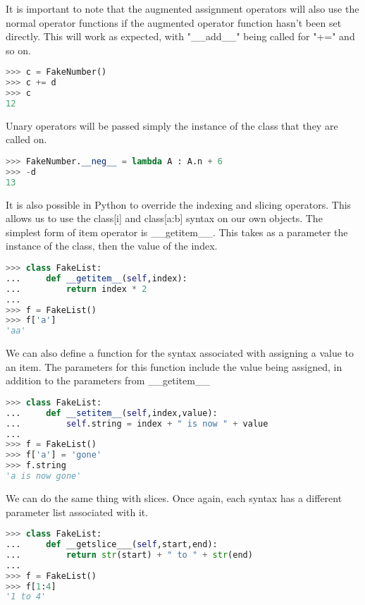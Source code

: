 It is important to note that the augmented assignment operators will also use
the normal operator functions if the augmented operator function hasn't been set
directly. This will work as expected, with "\_\_add\_\_" being called for "+=" and
so on.
\lstset{basicstyle=\scriptsize, numbers=left, captionpos=b, tabsize=4}
\begin{lstlisting}[caption=Add Assign Operator,language={Python},
xleftmargin=15pt, label=lst:addassignoperator]
>>> c = FakeNumber()
>>> c += d
>>> c
12
\end{lstlisting}

Unary operators will be passed simply the instance of the class that they are
called on.
\lstset{basicstyle=\scriptsize, numbers=left, captionpos=b, tabsize=4}
\begin{lstlisting}[caption=Unary Example,language={Python},
xleftmargin=15pt, label=lst:unaryexample]
>>> FakeNumber.__neg__ = lambda A : A.n + 6
>>> -d
13
\end{lstlisting}

It is also possible in Python to override the indexing and slicing operators.
This allows us to use the class[i] and class[a:b] syntax on our own objects.
The simplest form of item operator is \_\_getitem\_\_. This takes as a parameter the
instance of the class, then the value of the index.
\lstset{basicstyle=\scriptsize, numbers=left, captionpos=b, tabsize=4}
\begin{lstlisting}[caption=Index Operator,language={Python},
xleftmargin=15pt, label=lst:indexoperator]
>>> class FakeList:
...     def __getitem__(self,index):
...         return index * 2
...
>>> f = FakeList()
>>> f['a']
'aa'
\end{lstlisting}

We can also define a function for the syntax associated with assigning a value
to an item. The parameters for this function include the value being assigned,
in addition to the parameters from \_\_getitem\_\_
\lstset{basicstyle=\scriptsize, numbers=left, captionpos=b, tabsize=4}
\begin{lstlisting}[caption=Index Assign,language={Python},
xleftmargin=15pt, label=lst:indexassign]
>>> class FakeList:
...     def __setitem__(self,index,value):
...         self.string = index + " is now " + value
...
>>> f = FakeList()
>>> f['a'] = 'gone'
>>> f.string
'a is now gone'
\end{lstlisting}

We can do the same thing with slices. Once again, each syntax has a different
parameter list associated with it.
\lstset{basicstyle=\scriptsize, numbers=left, captionpos=b, tabsize=4}
\begin{lstlisting}[caption=Slice Operator,language={Python},
xleftmargin=15pt, label=lst:sliceoperator]
>>> class FakeList:
...     def __getslice___(self,start,end):
...         return str(start) + " to " + str(end)
...
>>> f = FakeList()
>>> f[1:4]
'1 to 4'
\end{lstlisting}

